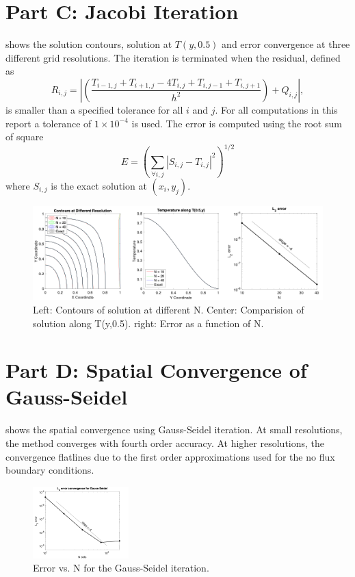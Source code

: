 \documentclass[reqno, 12pt]{amsart}
\begin{document}
    \section{Part C: Jacobi Iteration}
    \noindent {} shows the solution contours, solution at $T(y, 0.5)$ and error convergence at three different grid resolutions.
    The iteration is terminated when the residual, defined as
    \begin{equation*}
        R_{i,j} = \left|\left(\frac{T_{i-1,j} + T_{i + 1,j} - 4T_{i,j} + T_{i,j-1} + T_{i,j + 1}}{h^2}\right) + Q_{i,j}\right|,
    \end{equation*}
    is smaller than a specified tolerance for all $i$ and $j$.
    For all computations in this report a tolerance of $1\times 10^{-4}$ is used.
    The error is computed using the root sum of square
    \begin{equation*}
        E = \left(\sum_{\forall i, j} \left| S_{i,j} - T_{i,j}\right|^2\right)^{1/2}
    \end{equation*}
    where $S_{i,j}$ is the exact solution at $(x_i, y_j)$.
    \begin{figure}
        \centering
        \includegraphics[width=\textwidth]{partC.png}
        \caption{Left: Contours of solution at different N.
            Center: Comparision of solution along T(y,0.5).
            right: Error as a function of N.}
            \label{fig:C}
    \end{figure}

    \section{Part D: Spatial Convergence of Gauss-Seidel}
    \noindent{} shows the spatial convergence using Gauss-Seidel iteration.
    At small resolutions, the method converges with fourth order accuracy.
    At higher resolutions, the convergence flatlines due to the first order approximations used for the no flux boundary conditions.
    \begin{figure}
        \centering
        \includegraphics[width=0.33\textwidth]{partD.png}
        \caption{Error vs. N for the Gauss-Seidel iteration.}
        \label{fig:D}
    \end{figure}
\end{document}
